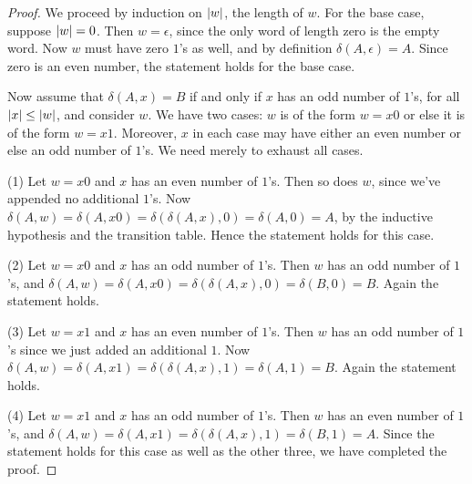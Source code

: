 \begin{proof}
We proceed by induction on $\left|w\right|$, the length of $w$. For the base case, suppose $\left|w\right| = 0$. Then $w = \epsilon$, since the only word of length zero is the empty word. Now $w$ must have zero $1$'s as well, and by definition $\delta(A, \epsilon) = A$. Since zero is an even number, the statement holds for the base case.

Now assume that $\delta(A, x) = B$ if and only if $x$ has an odd number of $1$'s, for all $\left|x\right| \leq \left|w\right|$, and consider $w$. 
We have two cases: $w$ is of the form $w = x0$ or else it is of the form $w = x1$. 
Moreover, $x$ in each case may have either an even number or else an odd number of $1$'s. 
We need merely to exhaust all cases.
 
(1) Let $w = x0$ and $x$ has an even number of $1$'s. 
Then so does $w$, since we've appended no additional $1$'s. 
Now $\delta(A, w) = \delta(A, x0) = \delta(\delta(A, x), 0) = \delta(A, 0) = A$, by the inductive hypothesis and the transition table. 
Hence the statement holds for this case. 

(2) Let $w = x0$ and $x$ has an odd number of $1$'s. 
Then $w$ has an odd number of $1$'s, and $\delta(A, w) = \delta(A, x0) = \delta(\delta(A, x), 0) = \delta(B, 0) = B$. 
Again the statement holds. 

(3) Let $w = x1$ and $x$ has an even number of $1$'s. 
Then $w$ has an odd number of $1$'s since we just added an additional $1$. 
Now $\delta(A, w) = \delta(A, x1) = \delta(\delta(A, x), 1) = \delta(A, 1) = B$. 
Again the statement holds. 

(4) Let $w = x1$ and $x$ has an odd number of $1$'s. 
Then $w$ has an even number of $1$'s, and $\delta(A, w) = \delta(A, x1) = \delta(\delta(A, x), 1) = \delta(B, 1) = A$. 
Since the statement holds for this case as well as the other three, we have completed the proof.
\end{proof}
\newpage
